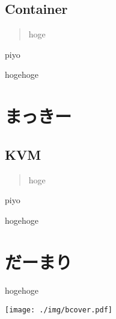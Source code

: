 \documentclass[9pt,b5paper,tombo]{jsbook}
\begin{document}
\subsection{Container}

\begin{quote}
hoge
\end{quote}

\begin{flushright}
piyo
\end{flushright}

hogehoge

\section{まっきー}

\subsection{KVM}

\begin{quote}
hoge
\end{quote}

\begin{flushright}
piyo
\end{flushright}

hogehoge

\section{だーまり}

hogehoge

\newpage


\enlargethispage{\paperwidth}
\thispagestyle{empty}
\vspace*{-1truein}
\vspace*{-\topmargin}
\vspace*{-\headheight}
\vspace*{-\headsep}
\vspace*{-\topskip}
\noindent\hspace*{-1in}\hspace*{-\oddsidemargin}
\texttt{[image: ./img/bcover.pdf]}
\end{document}

